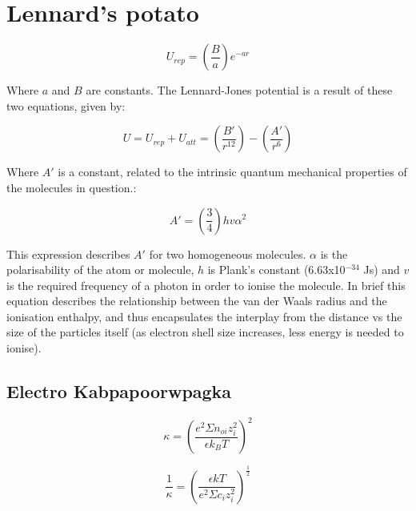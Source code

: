 \section{Lennard's potato}

\begin{equation} %
U_{rep} = \left(\frac{B}{a}\right) e^{-ar}
\end{equation}

Where $a$ and $B$ are constants. The Lennard-Jones potential is a result of these two equations, given by:

\begin{equation} %
U = U_{rep} + U_{att} = \left( \frac{B'}{r^{12}} \right) - \left( \frac{A'}{r^6}\right)
\end{equation}

Where $A'$ is a constant, related to the intrinsic quantum mechanical properties of the molecules in question.\cite{London}:

\begin{equation} %
A' = \left( \frac{3}{4} \right) h v \alpha^2
\end{equation}
%


This expression describes $A'$ for two homogeneous molecules. $\alpha$ is the polarisability of the atom or molecule, $h$ is Plank's constant (6.63x10$^{-34}$ Js) and $v$ is the required frequency of a photon in order to ionise the molecule. In brief this equation describes the relationship between the van der Waals radius and the ionisation enthalpy, and thus encapsulates the interplay from the distance vs the size of the particles itself (as electron shell size increases, less energy is needed to ionise).

\subsection{Electro Kabpapoorwpagka}
\begin{equation} %
\kappa = \left(\frac{e^2\Sigma n_{oi} z^2_i}{\epsilon k_B T}\right)^2 
\end{equation}

\begin{equation} 
\frac{1}{\kappa} = \left(\frac{\epsilon kT}{e^2 \Sigma c_i z_i^2}\right)^\frac{1}{2}
\end{equation}

